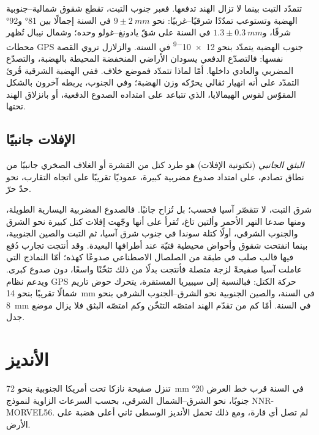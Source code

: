 تتمدّد التبت بينما لا تزال الهند تدفعها. فعبر جنوب التبت، تقطع شقوق شمالية--جنوبية
الهضبة وتستوعب تمدّدًا شرقيًا--غربيًا: نحو $9 \pm \qty{2}{mm}$ في السنة
إجمالًا بين \ang{81} و\ang{92} شرقًا، و$1.3 \pm \qty{0.3}{mm}$ في السنة على شقّ يادونغ--غولو
وحده؛ وشمال نيبال تُظهر محطات GPS جنوب الهضبة يتمدّد بنحو
\num{12e-9} في السنة. والزلازل تروي القصة نفسها: فالتصدّع الدفعي 
يسودان الأراضي المنخفضة المحيطة بالهضبة، والتصدّع المضربي والعادي داخلها.
أمّا لماذا تتمدّد فموضع خلاف. ففي الهضبة الشرقية قُرئ التمدّد على أنه انهيار
ثقالي يحرّكه وزن الهضبة؛ وفي الجنوب، يربطه آخرون بالشكل المقوّس
لقوس الهيمالايا، الذي تتباعد على امتداده الصدوع الدفعية، أو بانزلاق الهند تحتها.

\subsection{الإفلات جانبيًا}

\begin{definition}\label{def:b2:himalaya-andes:extrusion}
\emph{البثق الجانبي} (تكتونية الإفلات) هو طرد
كتل من القشرة أو الغلاف الصخري جانبيًا من نطاق تصادم، على امتداد صدوع مضربية كبيرة،
عموديًا تقريبًا على اتجاه التقارب، نحو حدّ حرّ.
\end{definition}

شرق التبت، لا تتقصّر آسيا فحسب؛ بل تُزاح جانبًا. فالصدوع المضربية اليسارية الطويلة،
ومنها صدعا النهر الأحمر وألتين تاغ، تُقرأ على أنها وجّهت
إفلات كتل كبيرة نحو الشرق والجنوب الشرقي، أولًا كتلة سوندا في جنوب شرق آسيا،
ثم التبت والصين الجنوبية، بينما انفتحت شقوق وأحواض محيطية فتيّة عند أطرافها البعيدة.
وقد أنتجت تجارب دُفع فيها قالب صلب في طبقة من الصلصال الاصطناعي صدوعًا كهذه؛ أمّا
النماذج التي عاملت آسيا صفيحةً لزجة متصلة فأنتجت بدلًا من ذلك تثخّنًا واسعًا، دون
صدوع كبرى. ويدعم نظام GPS حركة الكتل: فبالنسبة إلى سيبيريا المستقرة، يتحرك حوض
تاريم شمالًا تقريبًا بنحو \qty{14}{mm} في السنة، والصين الجنوبية نحو الشرق--الجنوب الشرقي
بنحو \qty{8}{mm} في السنة. أمّا كم من تقدّم الهند امتصّه التثخّن وكم
امتصّه البثق فلا يزال موضع جدل.

\section{الأنديز}\label{sec:b2:himalaya-andes:andes}

تنزل صفيحة نازكا تحت أمريكا الجنوبية بنحو \qty{72}{mm} في السنة قرب خط العرض
\ang{20} جنوبًا، نحو الشرق--الشمال الشرقي، بحسب السرعات الزاوية لنموذج NNR-MORVEL56. لم تصل
أي قارة، ومع ذلك تحمل الأنديز الوسطى ثاني أعلى هضبة على الأرض.

